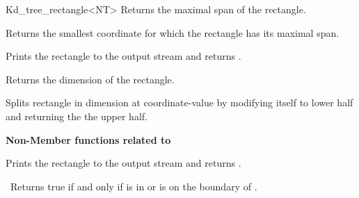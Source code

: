 \begin{ccRefClass}{Kd_tree_rectangle<NT>}
{Returns the maximal span of the rectangle.}

{Returns the smallest coordinate for which the rectangle has its maximal span.}

{Prints the rectangle to the output stream  and returns .}

{Returns the dimension of the rectangle.}

{Splits rectangle in dimension  at coordinate-value  
 by modifying itself to lower half and returning the the upper half.}

{\bf Non-Member functions related to }

\ccGlueBegin
{} 
{Prints the rectangle  to the output stream  and returns .}
\ccGlueEnd

\ccGlueBegin
{} \
{Returns true if and only if  is in  or is on the boundary of .}
\ccGlueEnd



\end{ccRefClass}


